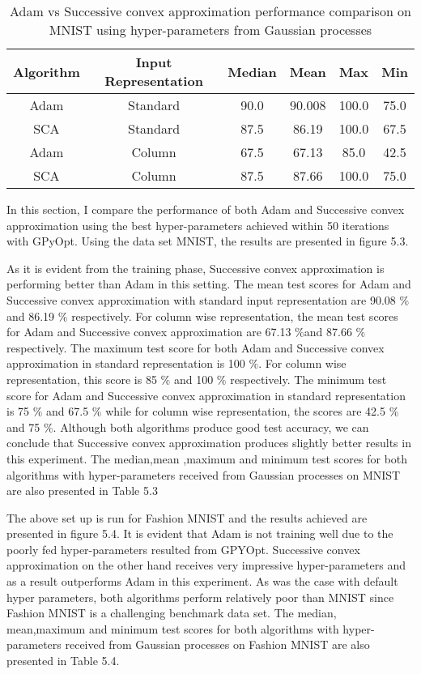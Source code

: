 \begin{table}
\begin{center}
 \begin{tabular}{||c|| c ||c|| c|| c|| c||} 
 \hline
 Algorithm & Input Representation & Median & Mean & Max & Min \\ [0.5ex] 
 \hline\hline
 Adam & Standard & 90.0 & 90.008 & 100.0 & 75.0 \\ 
 \hline
 SCA & Standard & 87.5 & 86.19 & 100.0 & 67.5 \\
 \hline
 Adam & Column & 67.5 & 67.13 & 85.0 & 42.5\\
 \hline
 SCA & Column & 87.5 & 87.66 & 100.0 & 75.0  \\
 \hline
\end{tabular}
\end{center}
\caption{Adam vs Successive convex approximation performance comparison on MNIST using hyper-parameters from Gaussian processes}
\end{table}

In this section, I compare the performance of both Adam and Successive convex approximation using the best hyper-parameters achieved within 50 iterations with GPyOpt. Using the data set MNIST, the results are presented in figure 5.3.

As it is evident from the training phase, Successive convex approximation is performing better than Adam in this setting. The mean test scores for Adam and Successive convex approximation with standard input representation are 90.08 $\%$and 86.19 $\%$ respectively. For column wise representation, the mean test scores for Adam and Successive convex approximation are 67.13 $\%$and 87.66 $\%$ respectively. The maximum test score for both Adam and Successive convex approximation in standard representation is 100 $\%$. For column wise representation, this score is 85 $\%$ and 100 $\%$ respectively. The minimum test score for Adam and Successive convex approximation in standard representation is 75 $\%$ and 67.5 $\%$ while for column wise representation, the scores are 42.5 $\%$ and 75 $\%$. Although both algorithms produce good test accuracy, we can conclude that Successive convex approximation produces slightly better results in this experiment. The median,mean ,maximum and minimum test scores for both algorithms with hyper-parameters received from Gaussian processes on MNIST are also presented in Table 5.3

The above set up is run for Fashion MNIST and the results achieved are presented in figure 5.4. It is evident that Adam is not training well due to the poorly fed hyper-parameters resulted from GPYOpt. Successive convex approximation on the other hand receives very impressive hyper-parameters and as a result outperforms Adam in this experiment. As was the case with default hyper parameters, both algorithms perform relatively poor than MNIST since Fashion MNIST is a challenging benchmark data set. The median, mean,maximum and minimum test scores for both algorithms with hyper-parameters received from Gaussian processes on Fashion MNIST are also presented in Table 5.4.

